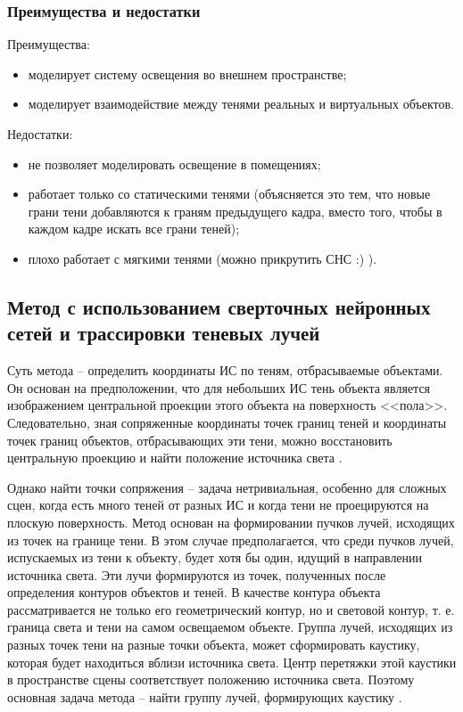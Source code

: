 \subsubsection*{Преимущества и недостатки}

Преимущества:
\begin{itemize}
	\item моделирует систему освещения во внешнем пространстве;
	\item моделирует взаимодействие между тенями реальных и виртуальных объектов.
\end{itemize}


Недостатки:
\begin{itemize}
	\item не позволяет моделировать освещение в помещениях;
	\item работает только со статическими тенями (объясняется это тем, что новые грани тени добавляются к граням предыдущего кадра, вместо того, чтобы в каждом кадре искать все грани теней);
	\item плохо работает с мягкими тенями (можно прикрутить СНС :) ).
\end{itemize}


\subsection{Метод с использованием сверточных нейронных сетей и трассировки теневых лучей}

Суть метода -- определить координаты ИС по теням, отбрасываемые объектами. Он основан на предположении, что для небольших ИС тень объекта является изображением центральной проекции этого объекта на поверхность <<пола>>. Следовательно, зная сопряженные координаты точек границ теней и координаты точек границ объектов, отбрасывающих эти тени, можно восстановить центральную проекцию и найти положение источника света \cite{sns_tras}.

Однако найти точки сопряжения -- задача нетривиальная, особенно для сложных сцен, когда есть много теней от разных ИС и когда тени не проецируются на плоскую поверхность. Метод основан на формировании пучков лучей, исходящих из точек на границе тени. В этом случае предполагается, что среди пучков лучей, испускаемых из тени к объекту, будет хотя бы один, идущий в направлении источника света. Эти лучи формируются из точек, полученных после определения контуров объектов и теней. В качестве контура объекта рассматривается не только его геометрический контур, но и световой контур, т. е. граница света и тени на самом освещаемом объекте. Группа лучей, исходящих из разных точек тени на разные точки объекта, может сформировать каустику, которая будет находиться вблизи источника света. Центр перетяжки этой каустики в пространстве сцены соответствует положению источника света. Поэтому основная задача метода -- найти группу лучей, формирующих каустику \cite{sns_tras}.

